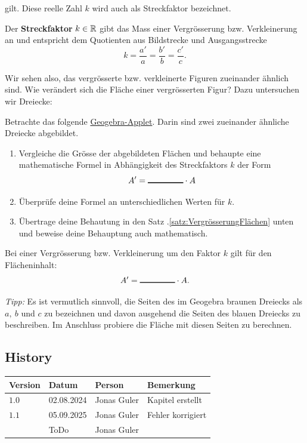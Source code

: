 \documentclass[11pt,oneside]{article}
\begin{document}
gilt. Diese reelle Zahl $k$ wird auch als Streckfaktor bezeichnet.
\begin{definition}[Streckfaktor]
	Der \textbf{Streckfaktor} $k\in\mathbb{R}$ gibt das Mass einer Vergrösserung bzw. Verkleinerung an und entspricht dem Quotienten aus Bildstrecke und Ausgangsstrecke \[k=\frac{a'}{a}=\frac{b'}{b}=\frac{c'}{c}.\]
\end{definition}
Wir sehen also, das vergrösserte bzw. verkleinerte Figuren zueinander ähnlich sind. Wie verändert sich die Fläche einer vergrösserten Figur? Dazu untersuchen wir Dreiecke:
\begin{aufgabe}
	Betrachte das folgende \href{https://www.geogebra.org/m/afqa8scd}{Geogebra-Applet}. Darin sind zwei zueinander ähnliche Dreiecke abgebildet.
	\begin{enumerate}[label=\alph*)]
		\item Vergleiche die Grösse der abgebildeten Flächen und behaupte eine mathematische Formel in Abhängigkeit des Streckfaktors $k$ der Form \[A'=\gap{1.5}\*A\]
		\item Überprüfe deine Formel an unterschiedlichen Werten für $k$.
	\end{enumerate}
	\vspace{5pt}
	\begin{enumerate}[label=\alph*)]\setcounter{enumi}{2}
		\item Übertrage deine Behautung in den Satz \thesection.\ref{satz:VergrösserungFlächen} unten und beweise deine Behauptung auch mathematisch.
	\end{enumerate}
\end{aufgabe}
\begin{satz}\label{satz:VergrösserungFlächen}
	Bei einer Vergrösserung bzw. Verkleinerung um den Faktor $k$ gilt für den Flächeninhalt: \[A'=\gap{1.5}\*A.\]
\end{satz}
\begin{beweis}
	\textit{Tipp:} Es ist vermutlich sinnvoll, die Seiten des im Geogebra braunen Dreiecks als $a,\: b$ und $c$ zu bezeichnen und davon ausgehend die Seiten des blauen Dreiecks zu beschreiben. Im Anschluss probiere die Fläche mit diesen Seiten zu berechnen.
	\vspace{5pt}\newline{}
\end{beweis}


\newpage
\subsection*{History}
\begin{table}[H]
	\centering
	\begin{tabular}{|p{13mm}|p{20mm}|p{30mm}|p{70mm}|}\hline
		Version & Datum & Person & Bemerkung \\\hline
		$1.0$ & 02.08.2024 & Jonas Guler & Kapitel erstellt \\\hline
		$1.1$ & 05.09.2025 & Jonas Guler & Fehler korrigiert \\\hline
		& ToDo & Jonas Guler & \\\hline
	\end{tabular}
\end{table}
\end{document}
